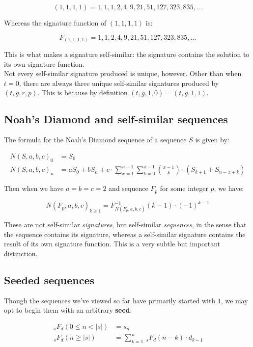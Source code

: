 \documentclass{article}
\begin{document}
$$(1, 1, 1, 1) = 1, 1, 1, 2, 4, 9, 21, 51, 127, 323, 835, ...$$

\noindent Whereas the signature function of $(1, 1, 1, 1)$ is:

$$F_{(1, 1, 1, 1)} = 1, 1, 2, 4, 9, 21, 51, 127, 323, 835, ...$$

\noindent This is what makes a signature self-similar: the signature contains the solution to its own signature function.\\

\noindent Not every self-similar signature produced is unique, however. Other than when $t = 0$, there are always three unique self-similar signatures produced by $(t, g, r,  p)$. This is because by definition $(t, g, 1, 0) = (t, g, 1, 1)$.\\


\subsection{Noah's Diamond and self-similar sequences}

The formula for the Noah's Diamond sequence of a sequence $S$ is given by:

\begin{align*}
N(S, a, b, c)_0 &= S_0\\
N(S, a, b, c)_n &= aS_0 + bS_n + c \cdot \sum_{x=1}^{n-1} \sum_{k=0}^{x - 1} \binom{x-1}{k} \cdot \left( S_{k+1} + S_{n-x+k} \right)
\end{align*}

\noindent Then when we have $a=b=c=2$ and sequence $F_p$ for some integer $p$, we have:

$$N(F_p, a, b, c)_{k \geq 1} = F^{-1}_{ N(F_p, a, b, c)} (k-1) \cdot (-1)^{k-1}$$

\noindent These are not self-similar \textit{signatures}, but self-similar \textit{sequences}, in the sense that the sequence contains its signature, whereas a self-similar signature contains the result of its own signature function. This is a very subtle but important distinction.

\subsection{Seeded sequences}

\noindent Though the sequences we've viewed so far have primarily started with $1$, we may opt to begin them with an arbitrary \textbf{seed}:

\begin{align*}
~_s F_d (0 \leq n < |s|) &= s_n\\
~_s F_d (n \geq |s|) &= \sum_{k=1}^{n}  ~_s F_d (n-k) \cdot d_{k-1}
\end{align*}
\end{document}
